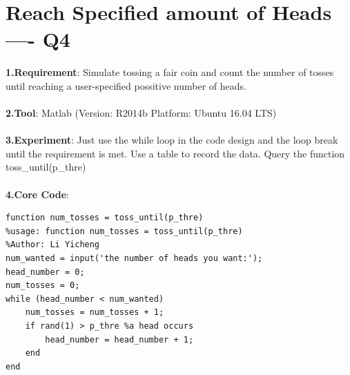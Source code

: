 \documentclass[twoside]{article}
\begin{document}
\section{Reach Specified amount of Heads ---- Q4}
\textbf{1.Requirement}: Simulate tossing a fair coin and count the number of tosses until reaching a user-specified possitive number of heads.\\ \\
\textbf{2.Tool}: Matlab (Version: R2014b Platform: Ubuntu 16.04 LTS)\\ \\
\textbf{3.Experiment}: Just use the while loop in the code design and the loop break until the requirement is met. Use a table to record the data. Query the function toss\_until(p\_thre)\\ \\
\textbf{4.Core Code}: \\
\begin{lstlisting}
function num_tosses = toss_until(p_thre)
%usage: function num_tosses = toss_until(p_thre)
%Author: Li Yicheng
num_wanted = input('the number of heads you want:');
head_number = 0;
num_tosses = 0;
while (head_number < num_wanted)
    num_tosses = num_tosses + 1;
    if rand(1) > p_thre %a head occurs
        head_number = head_number + 1;
    end
end
\end{lstlisting}
\end{document}
